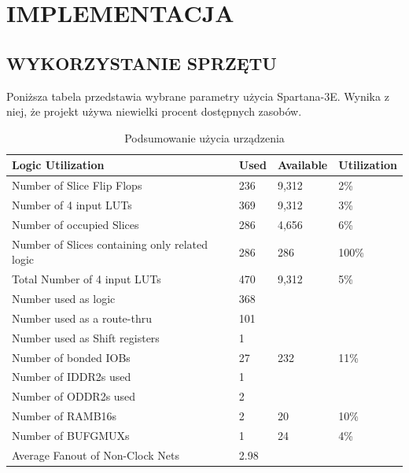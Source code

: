 \documentclass[11pt]{article}
\begin{document}
\section{IMPLEMENTACJA}

\subsection{WYKORZYSTANIE SPRZĘTU}

Poniższa tabela przedstawia wybrane parametry użycia Spartana-3E.
Wynika z niej, że projekt używa niewielki procent dostępnych zasobów.

\begin{table}[H]
\caption{Podsumowanie użycia urządzenia}
\begin{tabular}{|l|l|l|l|}
\hline
Logic Utilization &
Used &
Available &
Utilization \\
\hline
Number of Slice Flip Flops &
236 &
9,312 &
2\% \\
\hline
Number of 4 input LUTs &
369 &
9,312 &
3\% \\
\hline
Number of occupied Slices &
286 &
4,656 & 
6\% \\
\hline
Number of Slices containing only related logic &
286 &
286 &
100\% \\
\hline

Total Number of 4 input LUTs &
470 &
9,312 &
5\% \\
\hline
Number used as logic &
368 & & \\
\hline
 
Number used as a route-thru &
101 & & \\
\hline
 
Number used as Shift registers &
1 & & \\
\hline
 
Number of bonded IOBs &
27 &
232 &
11\% \\
\hline
Number of IDDR2s used &
1 & & \\
\hline 
 
Number of ODDR2s used &
2 & & \\
\hline
 
 
Number of RAMB16s &
2 &
20 &
10\% \\
\hline
Number of BUFGMUXs &
1 &
24 &
4\% \\
\hline
Average Fanout of Non-Clock Nets &
2.98 & & \\
\hline
\end{tabular}

\end{table}
\end{document}
